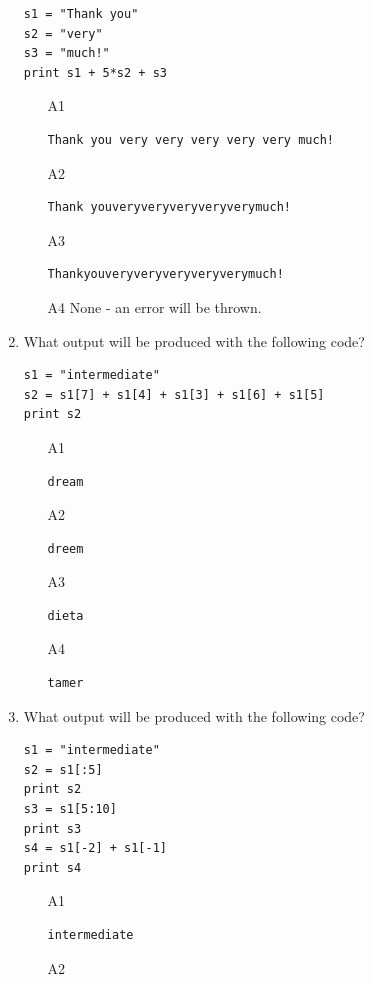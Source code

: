 \begin{enumerate}
\begin{verbatim}
s1 = "Thank you"
s2 = "very"
s3 = "much!"
print s1 + 5*s2 + s3
\end{verbatim}
\begin{enumerate}
\item[A1] 
\begin{verbatim}
Thank you very very very very very much!
\end{verbatim}
\item[A2] 
\begin{verbatim}
Thank youveryveryveryveryverymuch!
\end{verbatim}
\item[A3] 
\begin{verbatim}
Thankyouveryveryveryveryverymuch!
\end{verbatim}
\item[A4] 
None - an error will be thrown.
\end{enumerate}
\item What output will be produced with the following code?
\begin{verbatim}
s1 = "intermediate"
s2 = s1[7] + s1[4] + s1[3] + s1[6] + s1[5]
print s2
\end{verbatim}
\begin{enumerate}
\item[A1] 
\begin{verbatim}
dream
\end{verbatim}
\item[A2] 
\begin{verbatim}
dreem
\end{verbatim}
\item[A3] 
\begin{verbatim}
dieta
\end{verbatim}
\item[A4] 
\begin{verbatim}
tamer
\end{verbatim}
\end{enumerate}
\item What output will be produced with the following code?
\begin{verbatim}
s1 = "intermediate"
s2 = s1[:5]
print s2
s3 = s1[5:10]
print s3
s4 = s1[-2] + s1[-1]
print s4
\end{verbatim}
\begin{enumerate}
\item[A1] 
\begin{verbatim}
intermediate
\end{verbatim}
\item[A2] 

\end{enumerate}
\end{enumerate}
